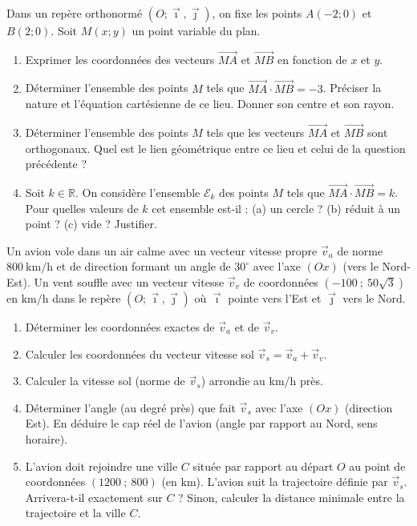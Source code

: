 \documentclass[11pt]{article}
\begin{document}
\begin{exercice}
Dans un repère orthonormé $(O;\vec{\imath},\vec{\jmath})$, on fixe les points $A(-2;0)$ et $B(2;0)$. Soit $M(x;y)$ un point variable du plan.
\begin{enumerate}
    \item Exprimer les coordonnées des vecteurs $\overrightarrow{MA}$ et $\overrightarrow{MB}$ en fonction de $x$ et $y$.
    \item Déterminer l'ensemble des points $M$ tels que $\overrightarrow{MA} \cdot \overrightarrow{MB} = -3$. Préciser la nature et l'équation cartésienne de ce lieu. Donner son centre et son rayon.
    \item Déterminer l'ensemble des points $M$ tels que les vecteurs $\overrightarrow{MA}$ et $\overrightarrow{MB}$ sont orthogonaux. Quel est le lien géométrique entre ce lieu et celui de la question précédente ?
    \item Soit $k \in \mathbb{R}$. On considère l'ensemble $\mathcal{E}_k$ des points $M$ tels que $\overrightarrow{MA} \cdot \overrightarrow{MB} = k$. Pour quelles valeurs de $k$ cet ensemble est-il : (a) un cercle ? (b) réduit à un point ? (c) vide ? Justifier.
\end{enumerate}
\end{exercice}

\begin{exercice}
Un avion vole dans un air calme avec un vecteur vitesse propre $\vec{v}_a$ de norme $800~\text{km/h}$ et de direction formant un angle de $30^\circ$ avec l'axe $(Ox)$ (vers le Nord-Est). Un vent souffle avec un vecteur vitesse $\vec{v}_v$ de coordonnées $(-100~;~50\sqrt{3})$ en $\text{km/h}$ dans le repère $(O;\vec{\imath},\vec{\jmath})$ où $\vec{\imath}$ pointe vers l'Est et $\vec{\jmath}$ vers le Nord.
\begin{enumerate}
    \item Déterminer les coordonnées exactes de $\vec{v}_a$ et de $\vec{v}_v$.
    \item Calculer les coordonnées du vecteur vitesse sol $\vec{v}_s = \vec{v}_a + \vec{v}_v$.
    \item Calculer la vitesse sol (norme de $\vec{v}_s$) arrondie au km/h près.
    \item Déterminer l'angle (au degré près) que fait $\vec{v}_s$ avec l'axe $(Ox)$ (direction Est). En déduire le cap réel de l'avion (angle par rapport au Nord, sens horaire).
    \item L'avion doit rejoindre une ville $C$ située par rapport au départ $O$ au point de coordonnées $(1200~;~800)$ (en km). L'avion suit la trajectoire définie par $\vec{v}_s$. Arrivera-t-il exactement sur $C$ ? Sinon, calculer la distance minimale entre la trajectoire et la ville $C$.
\end{enumerate}
\end{exercice}
\end{document}
